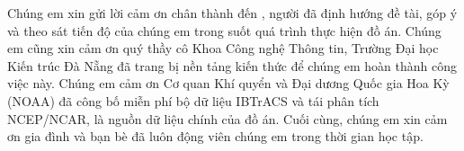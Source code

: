 \begin{acknowledgments}

Chúng em xin gửi lời cảm ơn chân thành đến \dauGVHD, người đã định hướng đề
tài, góp ý và theo sát tiến độ của chúng em trong suốt quá trình thực hiện đồ
án. Chúng em cũng xin cảm ơn quý thầy cô Khoa Công nghệ Thông tin, Trường Đại
học Kiến trúc Đà Nẵng đã trang bị nền tảng kiến thức để chúng em hoàn thành
công việc này. Chúng em cảm ơn Cơ quan Khí quyển và Đại dương Quốc gia Hoa Kỳ
(NOAA) đã công bố miễn phí bộ dữ liệu IBTrACS và tái phân tích NCEP/NCAR, là
nguồn dữ liệu chính của đồ án. Cuối cùng, chúng em xin cảm ơn gia đình và bạn
bè đã luôn động viên chúng em trong thời gian học tập.

\vspace{1.4em}
\noindent{}\hfill
{}

\end{acknowledgments}
